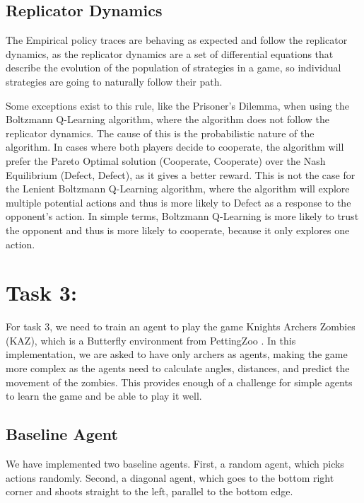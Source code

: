 \documentclass[12pt,a4paper, onecolumn]{exam}
\begin{document}
\subsection{Replicator Dynamics}

The Empirical policy traces are behaving as expected and follow the replicator dynamics, as the replicator dynamics are a set of differential equations
that describe the evolution of the population of strategies in a game, so individual strategies are going to naturally follow their path.

Some exceptions exist to this rule, like the Prisoner's Dilemma, when using the Boltzmann Q-Learning algorithm, where the algorithm
does not follow the replicator dynamics. The cause of this is the probabilistic nature of the algorithm.
In cases where both players decide to cooperate, the algorithm will prefer the Pareto Optimal solution (Cooperate, Cooperate)
over the Nash Equilibrium (Defect, Defect), as it gives a better reward. This is not the case for the Lenient Boltzmann Q-Learning algorithm,
where the algorithm will explore multiple potential actions and thus is more likely to Defect as a response to the opponent's action.
In simple terms, Boltzmann Q-Learning is more likely to trust the opponent and thus is more likely to cooperate, because it only explores one action.

\section{\textbf{Task 3:}}

For task 3, we need to train an agent to play the game Knights Archers Zombies (KAZ), which is a Butterfly environment from PettingZoo \cite{pettingzoo}.
In this implementation, we are asked to have only archers as agents, making the game more complex as the agents need to calculate
angles, distances, and predict the movement of the zombies. This provides enough of a challenge for simple agents to learn the game and be able to play it well.

\subsection{Baseline Agent}
We have implemented two baseline agents. First, a random agent, which picks actions randomly. Second, a diagonal agent, which goes to the bottom right corner
and shoots straight to the left, parallel to the bottom edge.
\end{document}
